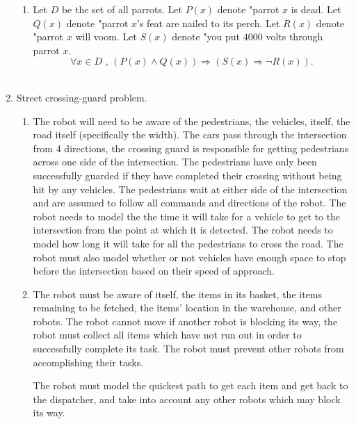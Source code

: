 \documentclass[10pt,oneside,reqno]{amsart}
\theoremstyle{plain}
\theoremstyle{definition}
\begin{document}
\begin{enumerate}[label=\arabic*.]
\begin{enumerate}[label=\alph*.]
\item Let $D$ be the set of all parrots. Let $P(x)$ denote "parrot $x$ is dead. Let $Q(x)$ denote "parrot $x$'s feat are nailed to its perch.  Let $R(x)$ denote "parrot $x$ will voom. Let $S(x)$ denote "you put $4000$ volts through parrot $x$.
\[\forall x \in D \text{ , } (P(x) \wedge Q(x)) \Rightarrow (S(x) \Rightarrow \neg R(x)).\]\\

\end{enumerate}

\item Street crossing-guard problem. 

\begin{enumerate}[label=\alph*.]

\item The robot will need to be aware of the pedestrians, the vehicles, itself, the road itself (specifically the width). The cars pass through the intersection from 4 directions, the crossing guard is responsible for getting pedestrians across one side of the intersection. The pedestrians have only been successfully guarded if they have completed their crossing without being hit by any vehicles. The pedestrians wait at either side of the intersection and are assumed to follow all commands and directions of the robot. The robot needs to model the the time it will take for a vehicle to get to the intersection from the point at which it is detected. The robot needs to model how long it will take for all the pedestrians to cross the road. The robot must also model whether or not vehicles have enough space to stop before the intersection based on their speed of approach. 

\item The robot must be aware of itself, the items in its basket, the items remaining to be fetched, the items' location in the warehouse, and other robots. The robot cannot move if another robot is blocking its way, the robot must collect all items which have not run out in order to successfully complete its task. The robot must prevent other robots from accomplishing their tasks. 

The robot must model the quickest path to get each item and get back to the dispatcher, and take into account any other robots which may block its way. 
\end{enumerate}



\end{enumerate}
\end{document}
